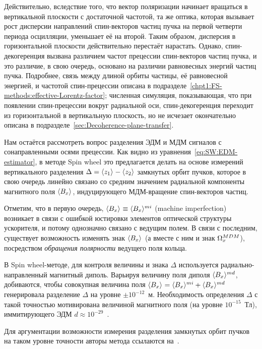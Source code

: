 Действительно, вследствие того, что 
вектор поляризации начинает вращаться в вертикальной плоскости с достаточной частотой, та же оптика,
которая вызывает рост дисперсии направлений спин-векторов частиц пучка на первой четверти
 периода осцилляции, уменьшает её на второй. Таким образом, дисперсия в горизонтальной плоскости
 действительно перестаёт нарастать. Однако, спин-декогеренция вызвана различием частот
 прецессии спин-векторов частиц пучка, и это различие, в свою очередь, основано на различии 
 равновесных энергий частиц пучка. Подробнее, связь между длиной орбиты частицы, её равновесной энергией, и частотой спин-прецессии описана в подразделе~\ref{chpt1:FS-methods:effective-Lorentz-factor};
 численная симуляция, показывающая, что при появлении спин-прецессии вокруг радиальной оси, 
 спин-декогеренция переходит из горизонтальной в вертикальную плоскость, но не исчезает окончательно
 описана в подразделе~\ref{sec:Decoherence-plane-transfer}.
 
Нам остаётся рассмотреть вопрос разделения ЭДМ и МДМ сигналов с сонаправленными осями прецессии.
Как видно из уравнения~\eqref{eq:SW:EDM-estimator}, в методе Spin wheel это предлагается делать 
на основе измерений вертикального разделения $\Delta = \avg{z_1} - \avg{z_2}$ замкнутых орбит пучков,
которое в свою очередь линейно связано со средним значением радиальной компоненты магнитного поля
$\avg{B_x}$, индуцирующего МДМ-вращение спин-векторов частиц. 

Отметим, что в первую очередь, $\avg{B_x} \equiv \avg{B_x}^{mi}$ (machine imperfection) возникает в связи 
с ошибкой юстировки элементов оптической структуры ускорителя, и потому 
однозначно связано с ведущим полем. 
В связи с последним, существует возможность изменять знак $\avg{B_x}$ 
(а вместе с ним и знак $\Omega_x^{MDM}$), посредством \emph{обращения полярности} ведущего поля кольца.

В Spin wheel-методе, для контроля величины и знака $\Delta$ используется радиально-направленный
магнитный диполь. Варьируя величину поля диполя $\avg{B_x}^{md}$, добиваются, чтобы совокупная величина 
поля ${\avg{B_x} = \avg{B_x}^{mi} + \avg{B_x}^{md}}$ генерировала разделение $\Delta$ на уровне 
$\pm 10^{-12}$~м. Необходимость определения $\Delta$ с такой точностью мотивирована
величиной магнитного поля (на уровне $10^{-15}$~Тл), иммитирующего ЭДМ ${d\approx 10^{-29}}$~\ecm.

Для аргументации возможности измерения разделения замкнутых орбит пучков на таком уровне точности
авторы метода ссылаются на~\cite{Kawall:BPM}. 



